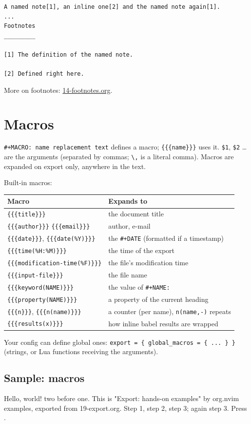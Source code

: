 \begin{verbatim}
A named note[1], an inline one[2] and the named note again[1].
...
Footnotes
_________

[1] The definition of the named note.

[2] Defined right here.
\end{verbatim}

More on footnotes: \href{14-footnotes.org}{14-footnotes.org}.
\section{Macros}
\label{sec:org529bed1}
\texttt{\#+MACRO: name replacement text} defines a macro; \texttt{\{\{\{name\}\}\}} uses it.
\texttt{\$1}, \texttt{\$2} \ldots{} are the arguments (separated by commas; \texttt{\textbackslash{},} is a literal
comma). Macros are expanded on export only, anywhere in the text.

Built-in macros:
\begin{center}
\begin{tabular}{ll}
Macro & Expands to\\
\hline
\texttt{\{\{\{title\}\}\}} & the document title\\
\texttt{\{\{\{author\}\}\}} \texttt{\{\{\{email\}\}\}} & author, e-mail\\
\texttt{\{\{\{date\}\}\}}, \texttt{\{\{\{date(\%Y)\}\}\}} & the \texttt{\#+DATE} (formatted if a timestamp)\\
\texttt{\{\{\{time(\%H:\%M)\}\}\}} & the time of the export\\
\texttt{\{\{\{modification-time(\%F)\}\}\}} & the file's modification time\\
\texttt{\{\{\{input-file\}\}\}} & the file name\\
\texttt{\{\{\{keyword(NAME)\}\}\}} & the value of \texttt{\#+NAME:}\\
\texttt{\{\{\{property(NAME)\}\}\}} & a property of the current heading\\
\texttt{\{\{\{n\}\}\}}, \texttt{\{\{\{n(name)\}\}\}} & a counter (per name), \texttt{n(name,-)} repeats\\
\texttt{\{\{\{results(x)\}\}\}} & how inline babel results are wrapped\\
\end{tabular}
\end{center}

Your config can define global ones: \texttt{export = \{ global\_macros = \{ ... \} \}}
(strings, or Lua functions receiving the arguments).
\subsection{Sample: macros}
\label{sec:org4554367}
Hello, world!  two before one.
This is "Export: hands-on examples" by org.nvim examples, exported from 19-export.org.
Step 1, step 2, step 3; again step 3.
Press .
